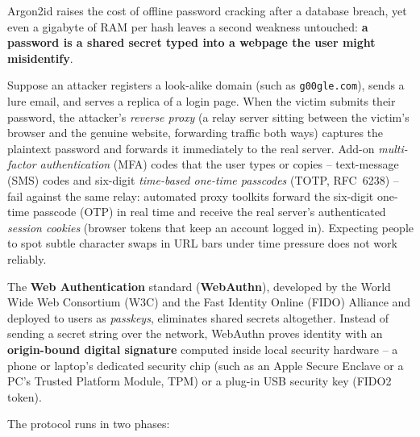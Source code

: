 Argon2id raises the cost of offline password cracking after a database breach, yet even a gigabyte of RAM per hash leaves a second weakness untouched: \textbf{a password is a shared secret typed into a webpage the user might misidentify}.

Suppose an attacker registers a look-alike domain (such as \texttt{g00gle.com}), sends a lure email, and serves a replica of a login page. When the victim submits their password, the attacker's \emph{reverse proxy} (a relay server sitting between the victim's browser and the genuine website, forwarding traffic both ways) captures the plaintext password and forwards it immediately to the real server. Add-on \emph{multi-factor authentication} (MFA) codes that the user types or copies -- text-message (SMS) codes and six-digit \emph{time-based one-time passcodes} (TOTP, RFC~6238) -- fail against the same relay: automated proxy toolkits forward the six-digit one-time passcode (OTP) in real time and receive the real server's authenticated \emph{session cookies} (browser tokens that keep an account logged in). Expecting people to spot subtle character swaps in URL bars under time pressure does not work reliably.

The \textbf{Web Authentication} standard (\textbf{WebAuthn}), developed by the World Wide Web Consortium (W3C) and the Fast Identity Online (FIDO) Alliance and deployed to users as \emph{passkeys}, eliminates shared secrets altogether. Instead of sending a secret string over the network, WebAuthn proves identity with an \textbf{origin-bound digital signature} computed inside local security hardware -- a phone or laptop's dedicated security chip (such as an Apple Secure Enclave or a PC's Trusted Platform Module, TPM) or a plug-in USB security key (FIDO2 token).

The protocol runs in two phases:

